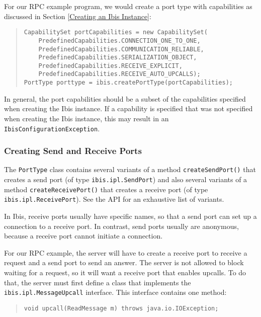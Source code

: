 \documentclass[10pt]{article}
\begin{document}
\noindent
For our RPC example program, we would create a port type with capabilities
as discussed in Section \ref{Creating an Ibis Instance}:

{\small
\begin{quote}
\begin{verbatim}
CapabilitySet portCapabilities = new CapabilitySet(
    PredefinedCapabilities.CONNECTION_ONE_TO_ONE,
    PredefinedCapabilities.COMMUNICATION_RELIABLE,
    PredefinedCapabilities.SERIALIZATION_OBJECT,
    PredefinedCapabilities.RECEIVE_EXPLICIT,
    PredefinedCapabilities.RECEIVE_AUTO_UPCALLS);
PortType porttype = ibis.createPortType(portCapabilities);
\end{verbatim}
\end{quote}
}
\noindent
In general, the port capabilities should be a subset of the capabilities
specified when creating the Ibis instance. If a capability
is specified that was not specified when creating the Ibis instance,
this may result in an \texttt{IbisConfigurationException}.

\subsubsection{Creating Send and Receive Ports}

The \texttt{PortType} class contains several variants of a method
\texttt{createSendPort()} that creates a send port (of type
\texttt{ibis.ipl.SendPort}) and
also several variants of a method \texttt{createReceivePort()} that
creates a receive port (of type \texttt{ibis.ipl.ReceivePort}).
See the API for an exhaustive list of variants.

In Ibis, receive ports usually have specific names, so that
a send port can set up a connection to a receive port. In contrast,
send ports usually are anonymous, because a receive port cannot
initiate a connection.

For our RPC example, the server will have to create a receive port
to receive a request and a send port to send an answer.
The server is not allowed to block waiting for a request, so it will
want a receive port that enables upcalls.
To do that, the server must first define a class that implements
the \texttt{ibis.ipl.MessageUpcall} interface. This interface contains one
method:

{\small
\begin{quote}
\begin{verbatim}
void upcall(ReadMessage m) throws java.io.IOException;
\end{verbatim}
\end{quote}
}
\end{document}
